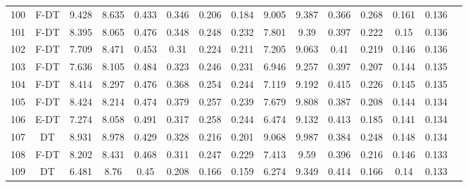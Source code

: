 \begin{longtable}{@{\hskip3pt}c@{\hskip3pt}c@{\hskip3pt}c@{\hskip3pt}c@{\hskip3pt}c@{\hskip3pt}c@{\hskip3pt}c@{\hskip3pt}c@{\hskip3pt}c@{\hskip3pt}c@{\hskip3pt}c@{\hskip3pt}c@{\hskip3pt}c@{\hskip3pt}c@{\hskip3pt}c}
        100 &           F-DT &             9.428 &       8.635 &           0.433 &           0.346 &           0.206 &           0.184 &               9.005 &       9.387 &           0.366 &         0.268 &          0.161 &           0.136 \\
        101 &           F-DT &             8.395 &       8.065 &           0.476 &           0.348 &           0.248 &           0.232 &               7.801 &        9.39 &           0.397 &         0.222 &           0.15 &           0.136 \\
        102 &           F-DT &             7.709 &       8.471 &           0.453 &            0.31 &           0.224 &           0.211 &               7.205 &       9.063 &            0.41 &         0.219 &          0.146 &           0.136 \\
        103 &           F-DT &             7.636 &       8.105 &           0.484 &           0.323 &           0.246 &           0.231 &               6.946 &       9.257 &           0.397 &         0.207 &          0.144 &           0.135 \\
        104 &           F-DT &             8.414 &       8.297 &           0.476 &           0.368 &           0.254 &           0.244 &               7.119 &       9.192 &           0.415 &         0.226 &          0.145 &           0.135 \\
        105 &           F-DT &             8.424 &       8.214 &           0.474 &           0.379 &           0.257 &           0.239 &               7.679 &       9.808 &           0.387 &         0.208 &          0.144 &           0.134 \\
        106 &           E-DT &             7.274 &       8.058 &           0.491 &           0.317 &           0.258 &           0.244 &               6.474 &       9.132 &           0.413 &         0.185 &          0.141 &           0.134 \\
        107 &             DT &             8.931 &       8.978 &           0.429 &           0.328 &           0.216 &           0.201 &               9.068 &       9.987 &           0.384 &         0.248 &          0.148 &           0.134 \\
        108 &           F-DT &             8.202 &       8.431 &           0.468 &           0.311 &           0.247 &           0.229 &               7.413 &        9.59 &           0.396 &         0.216 &          0.146 &           0.133 \\
        109 &             DT &             6.481 &        8.76 &            0.45 &           0.208 &           0.166 &           0.159 &               6.274 &       9.349 &           0.414 &         0.166 &           0.14 &           0.133 \\

\end{longtable}
